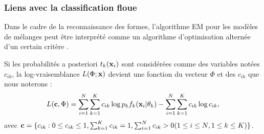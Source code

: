 \subsubsection{Liens avec la classification floue}

Dans le cadre de la reconnaissance des formes, l'algorithme EM
pour les mod\`eles de m\'elanges peut \^etre interpr\'et\'e comme un
algorithme d'optimisation altern\'ee d'un certain crit\`ere 
\cite{Hathaway1986,Celeux1994}.

Si les probabilit\'es a posteriori $t_k(\mbox{\bf x}_i)$ sont consid\'er\'ees comme 
des variables not\'ees $c_{ik}$, la log-vraisemblance $L(\Phi;\mbox{\bf x})$ 
devient une fonction du vecteur $\Phi$ et des $c_{ik}$ que nous noterons :
\begin{equation}
L(\mbox{\bf c},\Phi)=\sum_{i=1}^N \sum_{k=1}^K c_{ik} \log{p_k f_k(\mbox{\bf x}_i | \theta_k)}
           - \sum_{i=1}^N \sum_{k=1}^K c_{ik} \log{ c_{ik} },
\end{equation} 
avec $\mbox{\bf c}=\{c_{ik} :0 \leq c_{ik} \leq 1, \sum_{k=1}^K c_{ik}=1, \sum_{i=1}^N
c_{ik}>0 (1\leq i \leq N, 1 \leq k \leq K)   \}$.


